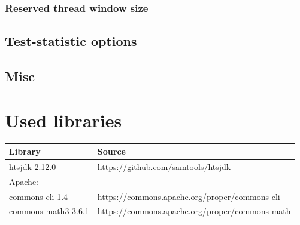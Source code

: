 \documentclass[10pt,a4paper,final]{article}
\begin{document}
\subsubsection{Reserved thread window size}

\subsection{Test-statistic options}


\subsection{Misc}


\section{Used libraries}
{\small
  \begin{tabular}{ll}
    \textbf{Library}          & \textbf{Source} \\
    \hline
    htsjdk 2.12.0             & \url{https://github.com/samtools/htsjdk} \\
    Apache:                   & \\
    \quad commons-cli 1.4     & \url{https://commons.apache.org/proper/commons-cli} \\
    \quad commons-math3 3.6.1 & \url{https://commons.apache.org/proper/commons-math}\\
  \end{tabular}
}


\end{document}
